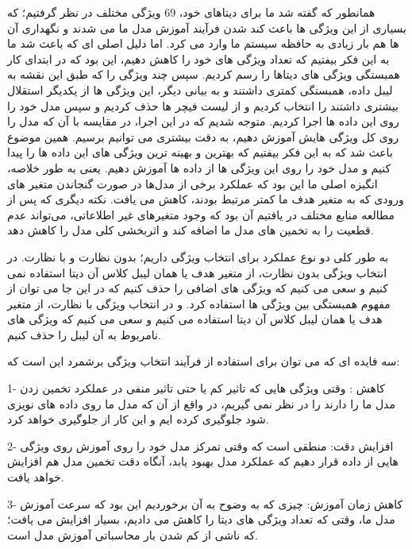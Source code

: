 \documentclass[12pt,onecolumn,a4paper]{article}
\begin{document}
همانطور که گفته شد ما برای دیتاهای خود، 69 ویژگی مختلف در نظر گرفتیم؛ که بسیاری از این ویژگی ها باعث کند شدن فرآیند آموزش مدل ما می شدند و نگهداری آن ها هم بار زیادی به حافظه سیستم ما وارد می کرد. اما دلیل اصلی ای که باعث شد ما به این فکر بیفتیم که تعداد ویژگی های خود را کاهش دهیم، این بود که در ابتدای کار  همبستگی ویژگی های دیتاها را رسم کردیم. سپس چند ویژگی را که طبق این نقشه به لیبل داده، همبستگی کمتری داشتند و به بیانی دیگر، این ویژگی ها از یکدیگر استقلال بیشتری داشتند را انتخاب کردیم و از لیست فیچر ها حذف کردیم و سپس مدل خود را روی این داده ها اجرا کردیم. 
متوجه شدیم که در این اجرا، در مقایسه با آن که مدل را روی کل ویژگی هایش آموزش دهیم، به دقت بیشتری می توانیم برسیم. همین موضوع باعث شد که به این فکر بیفتیم که بهترین و بهینه ترین ویژگی های این داده ها را پیدا کنیم و مدل خود را روی این ویژگی ها از داده ها آموزش دهیم.
یعنی به طور خلاصه، انگیزه اصلی ما این بود که عملکرد برخی از مدل‌ها در صورت گنجاندن متغیر های ورودی که به متغیر هدف ما کمتر مرتبط بودند، کاهش می یافت.
نکته دیگری که پس از مطالعه منابع مختلف در یافتیم آن بود که وجود متغیرهای غیر اطلاعاتی، می‌تواند عدم قطعیت را به تخمین های مدل ما اضافه کند و اثربخشی کلی مدل را کاهش دهد.

به طور کلی دو نوع عملکرد برای انتخاب ویژگی داریم؛ بدون نظارت و با نظارت.
در انتخاب ویژگی بدون نظارت، از متغیر هدف یا همان لیبل کلاس آن دیتا استفاده نمی کنیم و سعی می کنیم که ویژگی های اضافی را حذف کنیم که در این جا می توان از مفهوم همبستگی بین ویژگی ها استفاده کرد. و در انتخاب ویژگی با نظارت، از متغیر هدف یا همان لیبل کلاس آن دیتا استفاده می کنیم و سعی می کنیم که ویژگی های نامربوط به آن لیبل را حذف کنیم. 

سه فایده ای که می توان برای استفاده از فرآیند انتخاب ویژگی برشمرد این است که:

\vspace{10}

1- کاهش : وقتی ویژگی هایی که تاثیر کم یا حتی تاثیر منفی در عملکرد تخمین زدن مدل ما را دارند را در نظر نمی گیریم، در واقع از آن که مدل ما روی داده های نویزی  شود جلوگیری کرده ایم و این کار از  جلوگیری خواهد کرد.

2- افزایش دقت: منطقی است که وقتی تمرکز مدل خود را روی آموزش روی ویژگی هایی از داده قرار دهیم که عملکرد مدل بهبود یابد، آنگاه دقت تخمین مدل هم افزایش خواهد یافت.

3- کاهش زمان آموزش: چیزی که به وضوح به آن برخوردیم این بود که سرعت آموزش مدل ما، وقتی که تعداد ویژگی های دیتا را کاهش می دادیم، بسیار افزایش می یافت؛ که ناشی از کم شدن بار محاسباتی آموزش مدل است.

\vspace{10}
\end{document}
